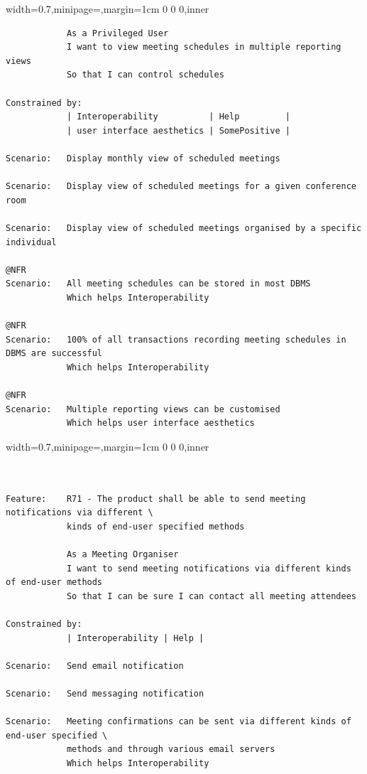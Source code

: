 \documentclass[dissertation,final]{softeng}
\newenvironment{featurecode}[1]
{ \lrbox\featurebox \begin{adjustbox}{width=#1\textwidth,minipage=\textwidth,margin=1cm 0 0 0,inner} }
{ \end{adjustbox}\endlrbox}
\newenvironment{featurelist}[2]
{
\newcommand{\setcaption}{\caption{#1}}
\newcommand{\setlabel}{\label{#2}}
}
{\begin{listing}[h!]\centering\usebox\featurebox\setcaption\setlabel\end{listing}}
\begin{document}
\begin{appendices}
\begin{featurelist}{R70 -- The product will allow privileged users to view meeting schedules}{lst:feature_r70}
\begin{featurecode}{0.7}
\begin{verbatim}
            As a Privileged User
            I want to view meeting schedules in multiple reporting views
            So that I can control schedules
	
Constrained by:
            | Interoperability          | Help         |
            | user interface aesthetics | SomePositive |

Scenario:   Display monthly view of scheduled meetings

Scenario:   Display view of scheduled meetings for a given conference room

Scenario:   Display view of scheduled meetings organised by a specific individual
	
@NFR	
Scenario:   All meeting schedules can be stored in most DBMS
            Which helps Interoperability

@NFR
Scenario:   100% of all transactions recording meeting schedules in DBMS are successful
            Which helps Interoperability

@NFR
Scenario:   Multiple reporting views can be customised
            Which helps user interface aesthetics
\end{verbatim}
\end{featurecode}
\end{featurelist}
\clearpage

\begin{featurelist}{R71 -- The product shall be able to send meeting notifications...}{lst:feature_r71}
\begin{featurecode}{0.7}
\begin{verbatim}


Feature:    R71 - The product shall be able to send meeting notifications via different \
            kinds of end-user specified methods

            As a Meeting Organiser
            I want to send meeting notifications via different kinds of end-user methods
            So that I can be sure I can contact all meeting attendees
	
Constrained by:
            | Interoperability | Help |

Scenario:   Send email notification

Scenario:   Send messaging notification

Scenario:   Meeting confirmations can be sent via different kinds of end-user specified \
            methods and through various email servers
            Which helps Interoperability
\end{verbatim}
\end{featurecode}
\end{featurelist}



\end{appendices}
\end{document}
